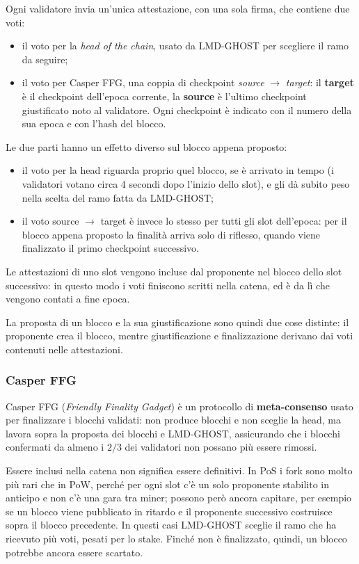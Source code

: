 \documentclass[a4paper, 11pt, oneside]{book}
\begin{document}
	Ogni validatore invia un'unica attestazione, con una sola firma, che contiene due
	voti:
	\begin{itemize}
		\item il voto per la \textit{head of the chain}, usato da LMD-GHOST per scegliere
			il ramo da seguire;
		\item il voto per Casper FFG, una coppia di checkpoint \textit{source}
			$\rightarrow$ \textit{target}: il \textbf{target} è il checkpoint dell'epoca
			corrente, la \textbf{source} è l'ultimo checkpoint giustificato noto al
			validatore. Ogni checkpoint è indicato con il numero della sua epoca e con
			l'hash del blocco.
	\end{itemize}
	Le due parti hanno un effetto diverso sul blocco appena proposto:
	\begin{itemize}
		\item il voto per la head riguarda proprio quel blocco, se è arrivato in tempo (i
			validatori votano circa 4 secondi dopo l'inizio dello slot), e gli dà subito
			peso nella scelta del ramo fatta da LMD-GHOST;
		\item il voto source $\rightarrow$ target è invece lo stesso per tutti gli slot
			dell'epoca: per il blocco appena proposto la finalità arriva solo di
			riflesso, quando viene finalizzato il primo checkpoint successivo.
	\end{itemize}
	Le attestazioni di uno slot vengono incluse dal proponente nel blocco dello slot
	successivo: in questo modo i voti finiscono scritti nella catena, ed è da lì che
	vengono contati a fine epoca.

	La proposta di un blocco e la sua giustificazione sono quindi due cose distinte: il
	proponente crea il blocco, mentre giustificazione e finalizzazione derivano dai voti
	contenuti nelle attestazioni.

	\subsubsection{Casper FFG}
	Casper FFG (\textit{Friendly Finality Gadget}) è un protocollo di
	\textbf{meta-consenso} usato per finalizzare i blocchi validati: non produce blocchi
	e non sceglie la head, ma lavora sopra la proposta dei blocchi e LMD-GHOST,
	assicurando che i blocchi confermati da almeno i $2/3$ dei validatori non possano più
	essere rimossi.

	Essere inclusi nella catena non significa essere definitivi. In PoS i fork sono
	molto più rari che in PoW, perché per ogni slot c'è un solo proponente stabilito in
	anticipo e non c'è una gara tra miner; possono però ancora capitare, per esempio se
	un blocco viene pubblicato in ritardo e il proponente successivo costruisce sopra il
	blocco precedente. In questi casi LMD-GHOST sceglie il ramo che ha ricevuto più voti,
	pesati per lo stake. Finché non è finalizzato, quindi, un blocco potrebbe ancora
	essere scartato.
\end{document}

